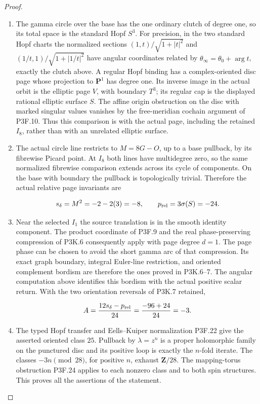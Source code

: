 \begin{proof}
\begin{enumerate}[label=\arabic*.]
\item The gamma circle over the base has the one ordinary clutch of
degree one, so its total space is the standard Hopf \(S^3\).
For precision, in the two standard Hopf charts the normalized
sections \((1,t)/\sqrt{1+|t|^2}\) and
\((1/t,1)/\sqrt{1+|1/t|^2}\) have angular coordinates related
by \(\theta_\infty=\theta_0+\arg t\), exactly the clutch
above.  A regular Hopf binding has a complex-oriented disc page
whose projection to \(\mathbf P^1\) has degree one.  Its inverse
image in the actual orbit is the elliptic page \(V\), with
boundary \(T^3\); its regular cap is the displayed rational
elliptic surface \(S\).  The affine origin obstruction on the
disc with marked singular values vanishes by the free-meridian
cochain argument of P3F.10.  Thus this comparison is with the
actual page, including the retained \(I_8\), rather than with
an unrelated elliptic surface.

\item The actual circle line restricts to \(M=8G-O\), up to a base
pullback, by its fibrewise Picard point.  At \(I_8\) both lines
have multidegree zero, so the same normalized fibrewise comparison
extends across its cycle of components.  On the base with boundary
the pullback is topologically trivial.  Therefore the actual
relative page invariants are

\[
 s_\delta=M^2=-2-2(3)=-8,
 \qquad p_{\rm rel}=3\sigma(S)=-24.
\]

\item Near the selected \(I_1\) the source translation is in the smooth
identity component.  The product coordinate of P3F.9 and the real
phase-preserving compression of P3K.6 consequently apply with
page degree \(d=1\).  The page phase can be chosen to avoid the
short gamma arc of that compression.  Its exact graph boundary,
integral Euler-line restriction, and oriented complement bordism
are therefore the ones proved in P3K.6–7.  The angular computation
above identifies this bordism with the actual positive scalar
return.  With the two orientation reversals of P3K.7 retained,

\[
 A=\frac{12s_\delta-p_{\rm rel}}{24}
   =\frac{-96+24}{24}=-3.
\]

\item The typed Hopf transfer and Eells--Kuiper normalization P3F.22 give
the asserted oriented class \(25\).  Pullback by
\(\lambda=z^n\) is a proper holomorphic family on the punctured
disc and its positive loop is exactly the \(n\)-fold iterate.
The classes \(-3n\pmod{28}\), for positive \(n\), exhaust
\(\mathbf Z/28\).  The mapping-torus obstruction P3F.24 applies
to each nonzero class and to both spin structures.  This proves
all the assertions of the statement.

\end{enumerate}
\end{proof}